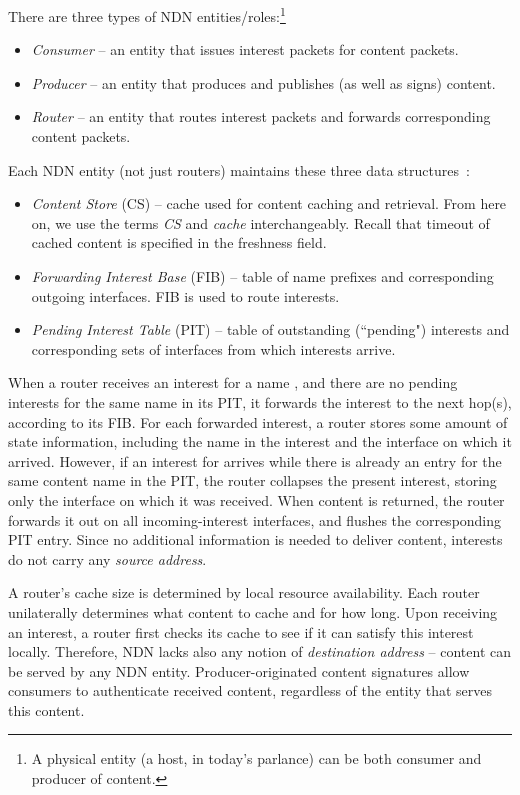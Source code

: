 \documentclass[conference]{IEEEtran}
\begin{document}
There are three types of NDN entities/roles:\footnote{A physical entity (a host, in today's 
parlance) can be both consumer and producer of content.}
\begin{itemize}
\item {\em Consumer} -- an entity that issues interest packets for content packets.
\item {\em Producer} -- an entity that produces and publishes (as well as signs) content. 
\item {\em Router} -- an entity that routes interest packets and forwards corresponding content 
packets. 
\end{itemize}
Each NDN entity (not just routers) maintains these three data structures~\cite{CCNxNodeImplementation}:
\begin{itemize}
\item {\em Content Store} (CS) -- cache used for content caching and retrieval. From here on, we use 
the terms {\em CS} and {\em cache} interchangeably. Recall that timeout of cached content is specified 
in the freshness field.
\item {\em Forwarding Interest Base} (FIB) -- table of name prefixes and corresponding outgoing 
interfaces. FIB is used to route interests.
\item {\em Pending Interest Table} (PIT) -- table of outstanding (``pending") interests and  
corresponding sets of interfaces from which interests arrive.
\end{itemize}
When a router receives an interest for a name , and there are no pending interests for the same name 
in its PIT, it forwards the interest to the next hop(s), according to its FIB. For each forwarded 
interest, a router stores some amount of state information, including the name in the interest and 
the interface on which it arrived. However, if an interest for  arrives while there is already an 
entry for the same content name in the PIT, the router collapses the present interest, 
storing only the interface on which it was received. When content is 
returned, the router forwards it out on all incoming-interest interfaces, and flushes the corresponding 
PIT entry. Since no additional information is needed to deliver content, interests do not carry 
any {\em source address}.

A router's cache size is determined by local resource availability. Each router unilaterally determines 
what content to cache and for how long. Upon receiving an interest, a router first checks its cache to 
see if it can satisfy this interest locally. Therefore, NDN lacks also any notion of {\em destination 
address} -- content can be served by any NDN entity. Producer-originated content signatures allow 
consumers to authenticate received content, regardless of the entity that serves this content.
\end{document}
